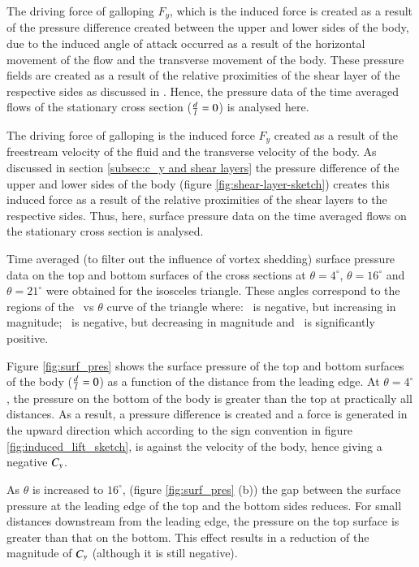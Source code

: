 The driving force of galloping $F_y$, which is the induced force is created as a result of the pressure difference created  between the upper and lower sides of the body, due to the induced angle of attack occurred as a result of the horizontal movement of the flow and the transverse movement of the body. These pressure fields are created as a result of the relative proximities of the shear layer of the respective sides as discussed in . Hence, the pressure data of the time averaged flows of the stationary cross section ($\frac{d}{l}=0$) is analysed here. 





The driving force of galloping is the induced force $F_y$ created as a result of the freestream velocity of the fluid and the transverse velocity of the body. As discussed in section \ref{subsec:c_y and shear layers} the pressure difference of the upper and lower sides of the body (figure \ref{fig:shear-layer-sketch}) creates this induced force as a result of the relative proximities of the shear layers to the respective sides. Thus, here, surface pressure data on the time averaged flows on the stationary cross section is analysed.

Time averaged (to filter out the influence of vortex shedding) surface pressure data  on the top and bottom surfaces of the cross sections at $\theta=4^{\circ}$, $\theta=16^{\circ}$ and $\theta=21^{\circ}$ were obtained for the isosceles triangle. These angles correspond to the regions of the \cy\ vs $\theta$ curve of the triangle where: \cy\ is negative, but increasing in magnitude; \cy\ is negative, but decreasing in magnitude and \cy\ is significantly positive.   

 

Figure \ref{fig:surf_pres} shows the surface pressure of the top and bottom surfaces of the body ($\frac{d}{l}=0$) as a function of the distance from the leading edge. At $\theta=4^{\circ}$, the pressure on the bottom of the body is greater than the top at practically all distances. As a result, a pressure difference is created and a force is generated in the upward direction which according to the sign convention in figure \ref{fig:induced_lift_sketch}, is against the velocity of the body, hence giving a negative $C_{y}$.

As $\theta$ is increased to $16^{\circ}$, (figure \ref{fig:surf_pres} (b)) the gap between the surface pressure at the leading edge of the top and the bottom sides reduces. For small distances downstream from the leading edge, the pressure on the top surface is greater than that on the bottom. This effect results in a reduction of the magnitude of $C_{y}$ (although it is still negative).

